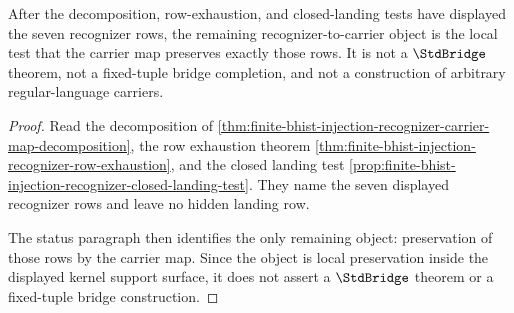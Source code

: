 \begin{theorem}
\label{thm:finite-bhist-injection-refuted-status}
After the decomposition, row-exhaustion, and closed-landing tests have displayed the seven recognizer rows, the remaining recognizer-to-carrier object is the local test that the carrier map preserves exactly those rows. It is not a $\StdBridge$ theorem, not a fixed-tuple bridge completion, and not a construction of arbitrary regular-language carriers.
\end{theorem}
\begin{proof}
Read the decomposition of \autoref{thm:finite-bhist-injection-recognizer-carrier-map-decomposition}, the row exhaustion theorem \autoref{thm:finite-bhist-injection-recognizer-row-exhaustion}, and the closed landing test \autoref{prop:finite-bhist-injection-recognizer-closed-landing-test}. They name the seven displayed recognizer rows and leave no hidden landing row.

The status paragraph then identifies the only remaining object: preservation of those rows by the carrier map. Since the object is local preservation inside the displayed kernel support surface, it does not assert a $\StdBridge$ theorem or a fixed-tuple bridge construction.
\end{proof}

